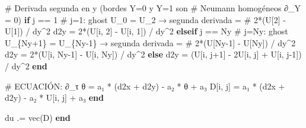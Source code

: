 \documentclass[
  spanish,
  us-letterpaper,
]{scrreprt}
\newenvironment{Shaded}{\begin{snugshade}}{\end{snugshade}}
\newcommand{\CommentTok}[1]{\textcolor[rgb]{0.37,0.37,0.37}{#1}}
\newcommand{\ControlFlowTok}[1]{\textcolor[rgb]{0.00,0.23,0.31}{\textbf{#1}}}
\newcommand{\FloatTok}[1]{\textcolor[rgb]{0.68,0.00,0.00}{#1}}
\newcommand{\FunctionTok}[1]{\textcolor[rgb]{0.28,0.35,0.67}{#1}}
\newcommand{\KeywordTok}[1]{\textcolor[rgb]{0.00,0.23,0.31}{\textbf{#1}}}
\newcommand{\NormalTok}[1]{\textcolor[rgb]{0.00,0.23,0.31}{#1}}
\newcommand{\OperatorTok}[1]{\textcolor[rgb]{0.37,0.37,0.37}{#1}}
\theoremstyle{definition}
\theoremstyle{plain}
\theoremstyle{remark}
\begin{document}
\begin{Shaded}
\begin{Highlighting}[]
        \CommentTok{\# Derivada segunda en y (bordes Y=0 y Y=1 son }
        \CommentTok{\# Neumann homogéneos ∂\_Y = 0)}
        \ControlFlowTok{if}\NormalTok{ j }\OperatorTok{==} \FloatTok{1}
            \CommentTok{\# j=1: ghost U\_0 = U\_2  → segunda derivada = }
            \CommentTok{\# 2*(U[2] {-} U[1]) / dy\^{}2}
\NormalTok{            d2y }\OperatorTok{=} \FloatTok{2}\FunctionTok{*}\NormalTok{(U[i, }\FloatTok{2}\NormalTok{] }\OperatorTok{{-}}\NormalTok{ U[i, }\FloatTok{1}\NormalTok{]) }\OperatorTok{/}\NormalTok{ dy}\OperatorTok{\^{}}\FloatTok{2}
        \ControlFlowTok{elseif}\NormalTok{ j }\OperatorTok{==}\NormalTok{ Ny}
            \CommentTok{\# j=Ny: ghost U\_\{Ny+1\} = U\_\{Ny{-}1\} → segunda derivada = }
            \CommentTok{\# 2*(U[Ny{-}1] {-} U[Ny]) / dy\^{}2}
\NormalTok{            d2y }\OperatorTok{=} \FloatTok{2}\FunctionTok{*}\NormalTok{(U[i, Ny}\OperatorTok{{-}}\FloatTok{1}\NormalTok{] }\OperatorTok{{-}}\NormalTok{ U[i, Ny]) }\OperatorTok{/}\NormalTok{ dy}\OperatorTok{\^{}}\FloatTok{2}
        \ControlFlowTok{else}
\NormalTok{            d2y }\OperatorTok{=}\NormalTok{ (U[i, j}\OperatorTok{+}\FloatTok{1}\NormalTok{] }\OperatorTok{{-}} \FloatTok{2}\NormalTok{U[i, j] }\OperatorTok{+}\NormalTok{ U[i, j}\OperatorTok{{-}}\FloatTok{1}\NormalTok{]) }\OperatorTok{/}\NormalTok{ dy}\OperatorTok{\^{}}\FloatTok{2}
        \ControlFlowTok{end}

        \CommentTok{\# ECUACIÓN: ∂\_τ θ = a₁ * (d2x + d2y) {-} a₂ * θ + a₃}
\NormalTok{        D[i, j] }\OperatorTok{=}\NormalTok{ a₁ }\OperatorTok{*}\NormalTok{ (d2x }\OperatorTok{+}\NormalTok{ d2y) }\OperatorTok{{-}}\NormalTok{ a₂ }\OperatorTok{*}\NormalTok{ U[i, j] }\OperatorTok{+}\NormalTok{ a₃}
    \ControlFlowTok{end}

\NormalTok{    du }\OperatorTok{.=} \FunctionTok{vec}\NormalTok{(D)}
\KeywordTok{end}
\end{Highlighting}
\end{Shaded}
\end{document}
